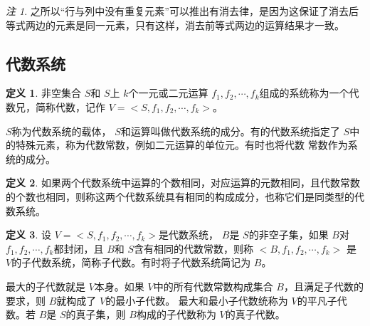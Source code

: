 \documentclass[a4paper,11pt]{article}%
\theoremstyle{remark}
\newtheorem*{remark}{注}
\theoremstyle{remark}
\theoremstyle{definition}
\theoremstyle{definition}
\newtheorem*{definition}{定义}
\theoremstyle{plain}
\begin{document}
\begin{remark}
    之所以“行与列中没有重复元素”可以推出有消去律，是因为这保证了消去后等式两边的元素是同一元素，只有这样，消去前等式两边的运算结果才一致。
\end{remark}
\subsection{代数系统}
\begin{definition}
    非空集合 $S $和 $S$上 $k$个一元或二元运算 $f_1,f_2,\cdots,f_k$组成的系统称为一个代数兄，简称代数，记作 $V=<S,f_1,f_2,\cdots,f_k>$。

    $S$称为代数系统的载体， $S$和运算叫做代数系统的成分。有的代数系统指定了 $S$中的特殊元素，称为代数常数，例如二元运算的单位元。有时也将代数
    常数作为系统的成分。
\end{definition}
\begin{definition}
    如果两个代数系统中运算的个数相同，对应运算的元数相同，且代数常数的个数也相同，则称这两个代数系统具有相同的构成成分，也称它们是同类型的代数系统。
\end{definition}
\begin{definition}
    设 $V=<S,f_1,f_2,\cdots,f_k>$是代数系统， $B$是 $S$的非空子集，如果 $B$对  $f_1,f_2,\cdots,f_k$都封闭，且 $B$和 $S$含有相同的代数常数，则称 $<B,f_1,f_2,\cdots,f_k>$
    是 $V$的子代数系统，简称子代数。有时将子代数系统简记为 $B$。
\end{definition}
最大的子代数就是 $V$本身。如果 $V$中的所有代数常数构成集合 $B$，且满足子代数的要求，则 $B$就构成了 $V$的最小子代数。
最大和最小子代数统称为 $V$的平凡子代数。若 $B$是 $S$的真子集，则 $B$构成的子代数称为 $V$的真子代数。
\end{document}
